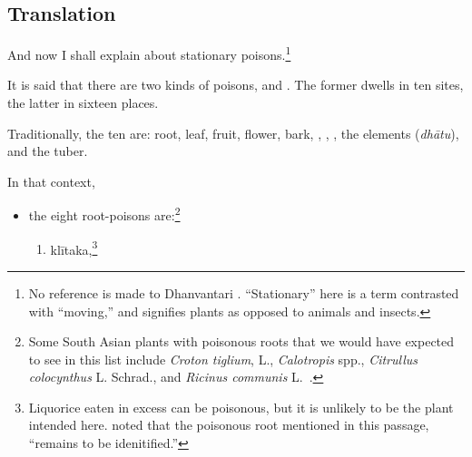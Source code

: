 \subsection{Translation}

\begin{translation}
    
    \item[1]
    And now I shall explain  about stationary 
    poisons.\footnote{No reference is made to Dhanvantari 
    \citep[see][]{birc-2021}. “Stationary” here is a term contrasted with “moving,” 
    and signifies plants as opposed to animals and insects.}
  
    \item[3]
    \noindent It is said that there are two kinds of poisons,
     and . The former
    dwells in ten sites, the latter in sixteen places.
   
    \item[4]
    Traditionally, the ten are: root, leaf, fruit, flower, bark,
    , , , the
    elements (\emph{dhātu}), and the tuber.

    \item[5]
    
    In that context,\label{poisonousplants}
    \begin{itemize}
        \item the eight root-poisons are:\footnote{Some South Asian plants with
    poisonous roots that we would have expected to see in this list include
    \emph{Croton tiglium}, L., \emph{Calotropis} spp., \emph{Citrullus colocynthus} L. 
    Schrad., and \emph{Ricinus
    communis} L.\ \citep{pill-2010}.} 
        \begin{enumerate}
        \item  \gls{klītaka},\footnote{Liquorice eaten in excess can be poisonous, but it is 
        unlikely to be the plant intended here.  \citet[124]{sing-1972} noted that the poisonous 
        root mentioned in this passage, “remains to be idenitified.”}
       

\end{enumerate}
\end{itemize}
\end{translation}
